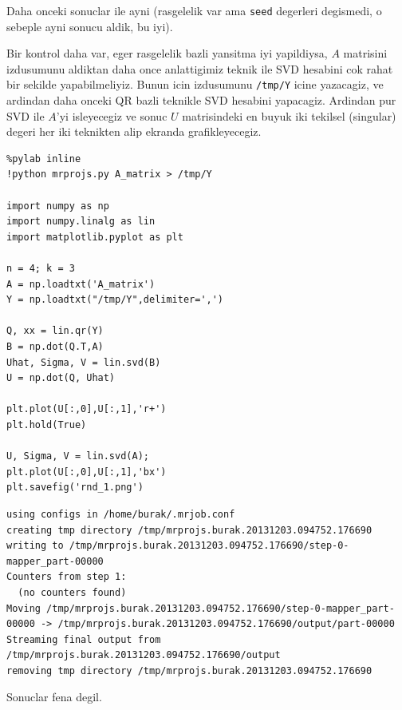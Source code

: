 \documentclass[12pt,fleqn]{article}\usepackage{../common}
\begin{document}
Daha onceki sonuclar ile ayni (rasgelelik var ama \verb!seed!
degerleri degismedi, o sebeple ayni sonucu aldik, bu iyi).

Bir kontrol daha var, eger rasgelelik bazli yansitma iyi yapildiysa, $A$
matrisini izdusumunu aldiktan daha once anlattigimiz teknik ile SVD
hesabini cok rahat bir sekilde yapabilmeliyiz. Bunun icin izdusumunu
\verb!/tmp/Y! icine yazacagiz, ve ardindan daha onceki QR bazli
teknikle SVD hesabini yapacagiz. Ardindan pur SVD ile $A$'yi isleyecegiz ve
sonuc $U$ matrisindeki en buyuk iki tekilsel (singular) degeri her iki
teknikten alip ekranda grafikleyecegiz.

\begin{verbatim}
%pylab inline
!python mrprojs.py A_matrix > /tmp/Y

import numpy as np
import numpy.linalg as lin
import matplotlib.pyplot as plt

n = 4; k = 3
A = np.loadtxt('A_matrix')
Y = np.loadtxt("/tmp/Y",delimiter=',')

Q, xx = lin.qr(Y)
B = np.dot(Q.T,A)
Uhat, Sigma, V = lin.svd(B)
U = np.dot(Q, Uhat)

plt.plot(U[:,0],U[:,1],'r+')
plt.hold(True)

U, Sigma, V = lin.svd(A);
plt.plot(U[:,0],U[:,1],'bx')
plt.savefig('rnd_1.png')
\end{verbatim}

\begin{verbatim}
using configs in /home/burak/.mrjob.conf
creating tmp directory /tmp/mrprojs.burak.20131203.094752.176690
writing to /tmp/mrprojs.burak.20131203.094752.176690/step-0-mapper_part-00000
Counters from step 1:
  (no counters found)
Moving /tmp/mrprojs.burak.20131203.094752.176690/step-0-mapper_part-00000 -> /tmp/mrprojs.burak.20131203.094752.176690/output/part-00000
Streaming final output from /tmp/mrprojs.burak.20131203.094752.176690/output
removing tmp directory /tmp/mrprojs.burak.20131203.094752.176690
\end{verbatim}

Sonuclar fena degil.
\end{document}
